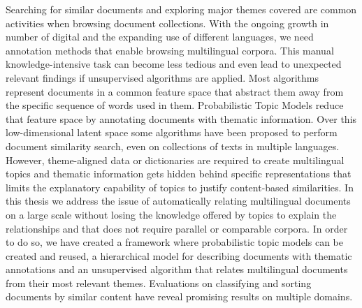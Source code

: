 


\begin{abstractslong}  
Searching for similar documents and exploring major themes covered are common activities when browsing document collections. With the ongoing growth in number of digital and the expanding use of different languages, we need annotation methods that enable browsing multilingual corpora. This manual knowledge-intensive task can become less tedious and even lead to unexpected relevant findings if unsupervised algorithms are applied. Most  algorithms represent documents in a common feature space that abstract them away from the specific sequence of words used in them. Probabilistic Topic Models reduce that feature space by annotating documents with thematic information. Over this low-dimensional latent space some algorithms have been proposed to perform document similarity search, even on collections of texts in multiple languages. However, theme-aligned data or dictionaries are required to create multilingual topics and thematic information gets hidden behind specific representations that limits the explanatory capability of topics to justify content-based similarities. In this thesis we address the issue of automatically relating multilingual documents on a large scale without losing the knowledge offered by topics to explain the relationships and that does not require parallel or comparable corpora. In order to do so, we have created a framework where probabilistic topic models can be created and reused, a hierarchical model for describing documents with thematic annotations and an unsupervised algorithm that relates multilingual documents from their most relevant themes. Evaluations on classifying and sorting documents by similar content have reveal promising results on multiple domains.


\end{abstractslong}

